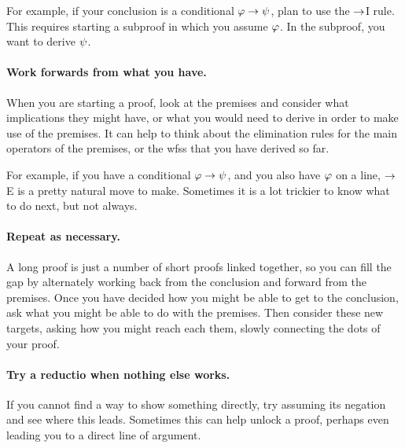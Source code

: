 For example, if your conclusion is a conditional $\varphi \rightarrow \psi$, plan to use the $\rightarrow$I rule.
This requires starting a subproof in which you assume $\varphi$.
In the subproof, you want to derive $\psi$.

\paragraph{Work forwards from what you have.}
When you are starting a proof, look at the premises and consider what implications they might have, or what you would need to derive in order to make use of the premises.
It can help to think about the elimination rules for the main operators of the premises, or the wfss that you have derived so far.

For example, if you have a conditional $\varphi\rightarrow\psi$, and you also have $\varphi$ on a line, $\rightarrow$E is a pretty natural move to make.
Sometimes it is a lot trickier to know what to do next, but not always.

%
%

\paragraph{Repeat as necessary.}
A long proof is just a number of short proofs linked together, so you can fill the gap by alternately working back from the conclusion and forward from the premises.
Once you have decided how you might be able to get to the conclusion, ask what you might be able to do with the premises.
Then consider these new targets, asking how you might reach each them, slowly connecting the dots of your proof.

\paragraph{Try a reductio when nothing else works.}
If you cannot find a way to show something directly, try assuming its negation and see where this leads.
Sometimes this can help unlock a proof, perhaps even leading you to a direct line of argument.


